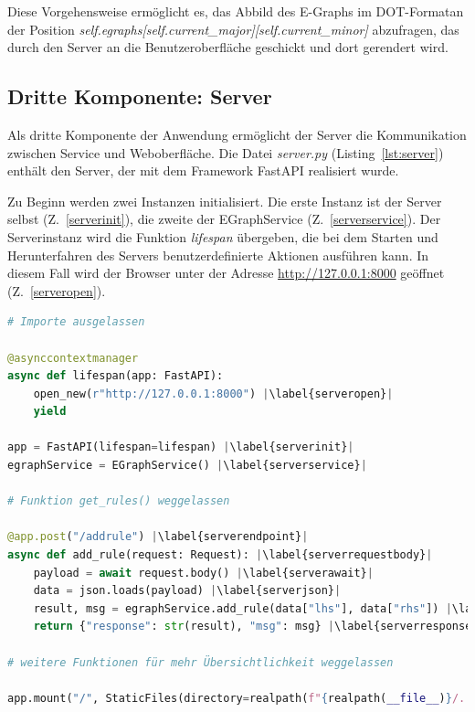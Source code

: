 Diese Vorgehensweise ermöglicht es, das Abbild des E-Graphs im DOT-Formatan der Position \textit{self.egraphs[self.current\_major][self.current\_minor]} abzufragen,
das durch den Server an die Benutzeroberfläche geschickt und dort gerendert wird.

\subsection{Dritte Komponente: Server}

Als dritte Komponente der Anwendung ermöglicht der Server die Kommunikation zwischen Service und Weboberfläche. 
Die Datei \textit{server.py} (Listing~\ref{lst:server}) enthält den Server, der mit dem Framework FastAPI realisiert wurde.

\noindent Zu Beginn werden zwei Instanzen initialisiert. Die erste Instanz ist der Server selbst (Z.~\ref{serverinit}), die zweite der EGraphService (Z.~\ref{serverservice}).
Der Serverinstanz wird die Funktion \textit{lifespan} übergeben, die bei dem Starten und Herunterfahren des Servers benutzerdefinierte Aktionen ausführen kann.
In diesem Fall wird der Browser unter der Adresse \url{http://127.0.0.1:8000} geöffnet (Z.~\ref{serveropen}).
\newpage

\begin{lstlisting}[language=Python, escapechar=|, caption=Auszug aus der Datei \textit{server.py}, label={lst:server}]
# Importe ausgelassen 

@asynccontextmanager
async def lifespan(app: FastAPI):
    open_new(r"http://127.0.0.1:8000") |\label{serveropen}|
    yield

app = FastAPI(lifespan=lifespan) |\label{serverinit}|
egraphService = EGraphService() |\label{serverservice}|

# Funktion get_rules() weggelassen

@app.post("/addrule") |\label{serverendpoint}|
async def add_rule(request: Request): |\label{serverrequestbody}|
    payload = await request.body() |\label{serverawait}|
    data = json.loads(payload) |\label{serverjson}|
    result, msg = egraphService.add_rule(data["lhs"], data["rhs"]) |\label{serveraction}|
    return {"response": str(result), "msg": msg} |\label{serverresponse}|

# weitere Funktionen für mehr Übersichtlichkeit weggelassen 

app.mount("/", StaticFiles(directory=realpath(f"{realpath(__file__)}/../static"), html=True), name="static") |\label{serverend}|
\end{lstlisting} 

